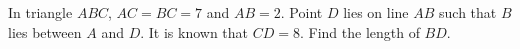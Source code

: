 In triangle $ABC$, $AC=BC=7$ and $AB=2$. Point $D$ lies on line $AB$ such that $B$ lies between $A$ and $D$. It is known that $CD=8$. Find the length of $BD$.
